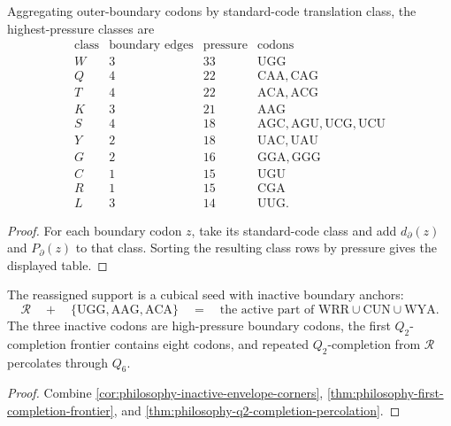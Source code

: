 \begin{theorem}
\label{thm:philosophy-boundary-class-pressure}
Aggregating outer-boundary codons by standard-code translation class,
the highest-pressure classes are
$$
\begin{array}{c|c|c|c}
  \text{class} & \text{boundary edges} & \text{pressure} & \text{codons}\\
  \hline
  W & 3 & 33 & \mathrm{UGG}\\
  Q & 4 & 22 & \mathrm{CAA},\mathrm{CAG}\\
  T & 4 & 22 & \mathrm{ACA},\mathrm{ACG}\\
  K & 3 & 21 & \mathrm{AAG}\\
  S & 4 & 18 & \mathrm{AGC},\mathrm{AGU},\mathrm{UCG},\mathrm{UCU}\\
  Y & 2 & 18 & \mathrm{UAC},\mathrm{UAU}\\
  G & 2 & 16 & \mathrm{GGA},\mathrm{GGG}\\
  C & 1 & 15 & \mathrm{UGU}\\
  R & 1 & 15 & \mathrm{CGA}\\
  L & 3 & 14 & \mathrm{UUG}.
\end{array}
$$
\end{theorem}
\begin{proof}
For each boundary codon $z$, take its standard-code class and add
$d_{\partial}(z)$ and $P_{\partial}(z)$ to that class. Sorting the
resulting class rows by pressure gives the displayed table.
\end{proof}

\begin{theorem}
\label{thm:philosophy-boundary-closure-structure}
The reassigned support is a cubical seed with inactive boundary
anchors:
$$
  \mathcal{R}
  \quad+\quad
  \{\mathrm{UGG},\mathrm{AAG},\mathrm{ACA}\}
  \quad=\quad
  \text{the active part of }
  \mathrm{WRR}\cup\mathrm{CUN}\cup\mathrm{WYA}.
$$
The three inactive codons are high-pressure boundary codons, the first
$Q_{2}$-completion frontier contains eight codons, and repeated
$Q_{2}$-completion from $\mathcal{R}$ percolates through $Q_{6}$.
\end{theorem}
\begin{proof}
Combine \autoref{cor:philosophy-inactive-envelope-corners},
\autoref{thm:philosophy-first-completion-frontier}, and
\autoref{thm:philosophy-q2-completion-percolation}.
\end{proof}

